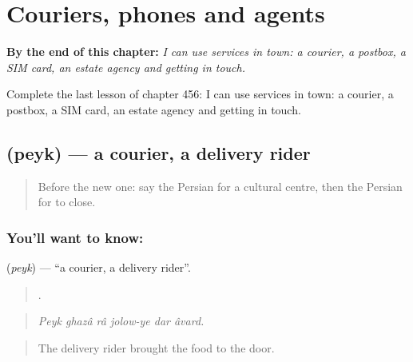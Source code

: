 
\chapter{Couriers, phones and agents}
\label{ch:fa-couriers-phones-and-agents}

\begin{chapteropening}
\textbf{By the end of this chapter:} \emph{I can use services in town: a courier, a postbox, a SIM card, an estate agency and getting in touch.}

Complete the last lesson of chapter 456: I can use services in town: a courier, a postbox, a SIM card, an estate agency and getting in touch.
\end{chapteropening}

\section[\texorpdfstring{\fa{پیک} (peyk)}{پیک (peyk)}]{ (peyk) — a courier, a delivery rider}

\label{lesson:FA-C456-peyk}



\begin{quote}
Before the new one: say the Persian for a cultural centre, then the Persian for to close.
\end{quote}

\subsection*{You'll want to know: }
\textbf{} (\emph{peyk}) — \textquotedblleft{}a courier, a delivery rider\textquotedblright{}.

\begin{quote}
     .
\end{quote}

\begin{quote}
\emph{Peyk ghazâ râ jolow-ye dar âvard.}
\end{quote}

\begin{quote}
The delivery rider brought the food to the door.
\end{quote}

